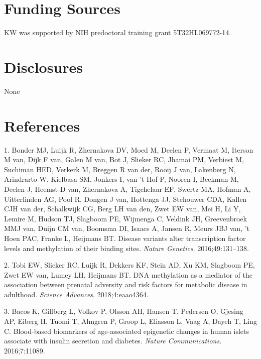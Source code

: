 \documentclass[]{article}
\begin{document}
\hypertarget{funding-sources}{%
\section{Funding Sources}\label{funding-sources}}

KW was supported by NIH predoctoral training grant 5T32HL069772-14.

\hypertarget{disclosures}{%
\section{Disclosures}\label{disclosures}}

None

\hypertarget{references}{%
\section*{References}\label{references}}

\hypertarget{refs}{}
\leavevmode\hypertarget{ref-Bonder2016}{}%
1. Bonder MJ, Luijk R, Zhernakova DV, Moed M, Deelen P, Vermaat M,
Iterson M van, Dijk F van, Galen M van, Bot J, Slieker RC, Jhamai PM,
Verbiest M, Suchiman HED, Verkerk M, Breggen R van der, Rooij J van,
Lakenberg N, Arindrarto W, Kielbasa SM, Jonkers I, van 't Hof P, Nooren
I, Beekman M, Deelen J, Heemst D van, Zhernakova A, Tigchelaar EF,
Swertz MA, Hofman A, Uitterlinden AG, Pool R, Dongen J van, Hottenga JJ,
Stehouwer CDA, Kallen CJH van der, Schalkwijk CG, Berg LH van den, Zwet
EW van, Mei H, Li Y, Lemire M, Hudson TJ, Slagboom PE, Wijmenga C,
Veldink JH, Greevenbroek MMJ van, Duijn CM van, Boomsma DI, Isaacs A,
Jansen R, Meurs JBJ van, 't Hoen PAC, Franke L, Heijmans BT. Disease
variants alter transcription factor levels and methylation of their
binding sites. \emph{Nature Genetics}. 2016;49:131--138.

\leavevmode\hypertarget{ref-Tobi2018}{}%
2. Tobi EW, Slieker RC, Luijk R, Dekkers KF, Stein AD, Xu KM, Slagboom
PE, Zwet EW van, Lumey LH, Heijmans BT. DNA methylation as a mediator of
the association between prenatal adversity and risk factors for
metabolic disease in adulthood. \emph{Science Advances}.
2018;4:eaao4364.

\leavevmode\hypertarget{ref-Bacos2016}{}%
3. Bacos K, Gillberg L, Volkov P, Olsson AH, Hansen T, Pedersen O,
Gjesing AP, Eiberg H, Tuomi T, Almgren P, Groop L, Eliasson L, Vaag A,
Dayeh T, Ling C. Blood-based biomarkers of age-associated epigenetic
changes in human islets associate with insulin secretion and diabetes.
\emph{Nature Communications}. 2016;7:11089.
\end{document}
